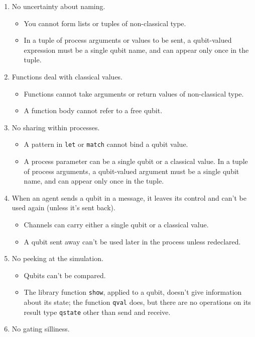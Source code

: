 \documentclass[11pt,a4paper]{book}
\newcommand{\verbtt}[1]{\texttt{\small{}#1}}
\begin{document}
\begin{enumerate}
\item No uncertainty about naming.
\begin{itemize}
\item You cannot form lists or tuples of non-classical type. 
\item In a tuple of process arguments or values to be sent, a qubit-valued expression must be a single qubit name, and can appear only once in the tuple.
\end{itemize}
\item Functions deal with classical values.
\begin{itemize}
\item Functions cannot take arguments or return values of non-classical type.
\item A function body cannot refer to a free qubit.
\end{itemize}
\item No sharing within processes.
\begin{itemize}
\item A pattern in \verbtt{let} or \verbtt{match} cannot bind a qubit value.
\item A process parameter can be a single qubit or a classical value. In a tuple of process arguments, a qubit-valued argument must be a single qubit name, and can appear only once in the tuple.
\end{itemize}
\item When an agent sends a qubit in a message, it leaves its control and can't be used again (unless it's sent back). 
\begin{itemize}
\item Channels can carry either a single qubit or a classical value.
\item A qubit sent away can't be used later in the process unless redeclared.
\end{itemize}
\item No peeking at the simulation.
\begin{itemize}
\item Qubits can't be compared.
\item The library function \verbtt{show}, applied to a qubit, doesn't give information about its state; the function \verbtt{qval} does, but there are no operations on its result type \verbtt{qstate} other than send and receive.
\end{itemize}
\item No gating silliness.
\begin{itemize}

\end{itemize}
\end{enumerate}
\end{document}
